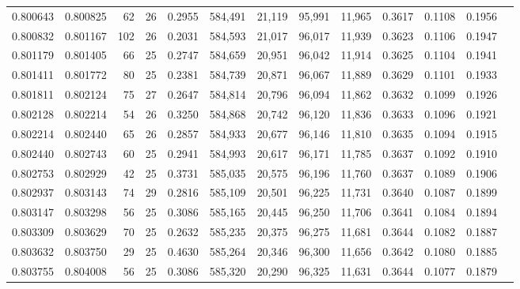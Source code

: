\begin{tabular}{rrrrrrrrrrrrr}
0.800643 & 0.800825 &    62 &  26 &                                     0.2955 & 584,491 &  21,119 &  95,991 &  11,965 & 0.3617 & 0.1108 & 0.1956 \\
0.800832 & 0.801167 &   102 &  26 &                                     0.2031 & 584,593 &  21,017 &  96,017 &  11,939 & 0.3623 & 0.1106 & 0.1947 \\
0.801179 & 0.801405 &    66 &  25 &                                     0.2747 & 584,659 &  20,951 &  96,042 &  11,914 & 0.3625 & 0.1104 & 0.1941 \\
0.801411 & 0.801772 &    80 &  25 &                                     0.2381 & 584,739 &  20,871 &  96,067 &  11,889 & 0.3629 & 0.1101 & 0.1933 \\
0.801811 & 0.802124 &    75 &  27 &                                     0.2647 & 584,814 &  20,796 &  96,094 &  11,862 & 0.3632 & 0.1099 & 0.1926 \\
0.802128 & 0.802214 &    54 &  26 &                                     0.3250 & 584,868 &  20,742 &  96,120 &  11,836 & 0.3633 & 0.1096 & 0.1921 \\
0.802214 & 0.802440 &    65 &  26 &                                     0.2857 & 584,933 &  20,677 &  96,146 &  11,810 & 0.3635 & 0.1094 & 0.1915 \\
0.802440 & 0.802743 &    60 &  25 &                                     0.2941 & 584,993 &  20,617 &  96,171 &  11,785 & 0.3637 & 0.1092 & 0.1910 \\
0.802753 & 0.802929 &    42 &  25 &                                     0.3731 & 585,035 &  20,575 &  96,196 &  11,760 & 0.3637 & 0.1089 & 0.1906 \\
0.802937 & 0.803143 &    74 &  29 &                                     0.2816 & 585,109 &  20,501 &  96,225 &  11,731 & 0.3640 & 0.1087 & 0.1899 \\
0.803147 & 0.803298 &    56 &  25 &                                     0.3086 & 585,165 &  20,445 &  96,250 &  11,706 & 0.3641 & 0.1084 & 0.1894 \\
0.803309 & 0.803629 &    70 &  25 &                                     0.2632 & 585,235 &  20,375 &  96,275 &  11,681 & 0.3644 & 0.1082 & 0.1887 \\
0.803632 & 0.803750 &    29 &  25 &                                     0.4630 & 585,264 &  20,346 &  96,300 &  11,656 & 0.3642 & 0.1080 & 0.1885 \\
0.803755 & 0.804008 &    56 &  25 &                                     0.3086 & 585,320 &  20,290 &  96,325 &  11,631 & 0.3644 & 0.1077 & 0.1879 \\

\end{tabular}
